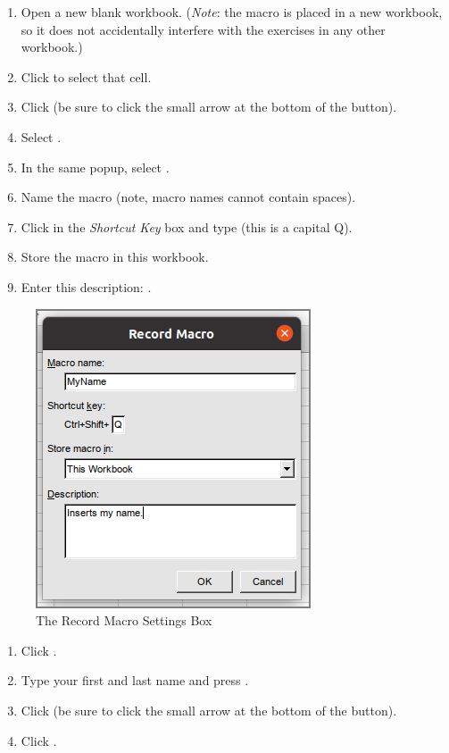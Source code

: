 \begin{enumerate}
	\item Open a new blank workbook. (\textit{Note}: the macro is placed in a new workbook, so it does not accidentally interfere with the exercises in any other workbook.)
	\item Click  to select that cell.
	\item Click  (be sure to click the small arrow at the bottom of the  button).
	\item Select .
	\item In the same popup, select .
	\item Name the macro  (note, macro names cannot contain spaces).
	\item Click in the \textit{Shortcut Key} box and type  (this is a capital Q). 
	\item Store the macro in this workbook.
	\item Enter this description: .
\end{enumerate}

\begin{figure}[H]
	\centering
	\includegraphics[width=\maxwidth{.75\linewidth}]{gfx/ch09_fig65}
	\caption{The Record Macro Settings Box}
	\label{09:fig65}
\end{figure}

\begin{enumerate}[resume]	
	\item Click .
	\item Type your first and last name and press .
	\item Click  (be sure to click the small arrow at the bottom of the  button).
	\item Click .
\end{enumerate}

